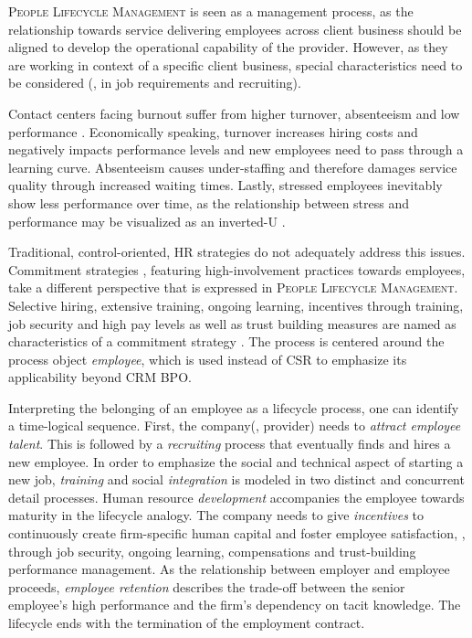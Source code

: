 	\textsc{People Lifecycle Management} is seen as a management process, as the relationship towards service delivering employees across client business should be aligned to develop the operational capability of the provider. However, as they are working in context of a specific client business, special characteristics need to be considered (\eg, in job requirements and recruiting). 
	
	Contact centers facing burnout suffer from higher turnover, absenteeism and low performance \citep{Tuten_2004}. Economically speaking, turnover increases hiring costs and negatively impacts performance levels and new employees need to pass through a learning curve. Absenteeism causes under-staffing and therefore damages service quality through increased waiting times. Lastly, stressed employees inevitably show less performance over time, as the relationship between stress and performance may be visualized as an inverted-U \citep[]{Tuten_2004}.
	
	Traditional, control-oriented, HR strategies do not adequately address this issues. Commitment strategies  \citep{Batt2002, Batt_2002}, featuring high-involvement practices towards employees, take a different perspective that is expressed in \textsc{People Lifecycle Management}. Selective hiring, extensive training, ongoing learning, incentives through training, job security and high pay levels as well as trust building measures are named as characteristics of a commitment strategy \citep{Batt2002}. The process is centered around the process object \textit{employee}, which is used instead of \acrshort{CSR} to emphasize its applicability beyond \acrshort{CRM} \acrshort{BPO}.
	
	Interpreting the belonging of an employee as a lifecycle process, one can identify a time-logical sequence. First, the company(\ie, provider) needs to \textit{attract employee talent}. This is followed by a \textit{recruiting} process that eventually finds and hires a new employee. In order to emphasize the social and technical aspect of starting a new job, \textit{training} and social \textit{integration} is modeled in two distinct and concurrent detail processes. Human resource \textit{development} accompanies the employee towards maturity in the lifecycle analogy. The company needs to give \textit{incentives} to continuously create firm-specific human capital and foster employee satisfaction, \eg, through job security, ongoing learning, compensations and trust-building performance management. As the relationship between employer and employee proceeds, \textit{employee retention} describes the trade-off between the senior employee's high performance and the firm's dependency on tacit knowledge. The lifecycle ends with the termination of the employment contract. 
	
